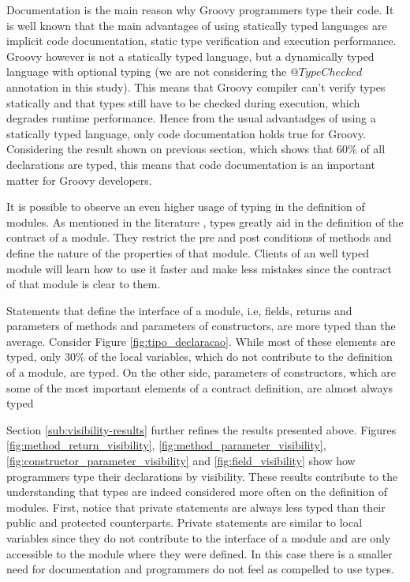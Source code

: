 \documentclass[preprint]{sigplanconf}
\begin{document}
Documentation is the main reason why Groovy programmers type their code.
It is well known that the main advantages of using statically typed languages are implicit code documentation, static type verification and execution performance.
Groovy however is not a statically typed language, but a dynamically typed language with optional typing (we are not considering the $@TypeChecked$ annotation in this study).
This means that Groovy compiler can't verify types statically and that types still have to be checked during execution, which degrades runtime performance.
Hence from the usual advantadges of using a statically typed language, only code documentation holds true for Groovy.
Considering the result shown on previous section, which shows that 60\% of all declarations are typed, this means that code documentation is an important matter for Groovy developers.

It is possible to observe an even higher usage of typing in the definition of modules.
As mentioned in the literature \cite{Meyer88, Meijer04, Wadler04, Plosch97, Flanagan2006, Furr09}, types greatly aid in the definition of the contract of a module.
They restrict the pre and post conditions of methods and define the nature of the properties of that module.
Clients of an well typed module will learn how to use it faster and make less mistakes since the contract of that module is clear to them.

Statements that define the interface of a module, i.e, fields, returns and parameters of methods and parameters of constructors, are more typed than the average.
Consider Figure \ref{fig:tipo_declaracao}.
While most of these elements are typed, only 30\%  of the local variables, which do not contribute to the definition of a module, are typed. On the other side, parameters of constructors, which are some of the most important elements of a contract definition, are almost always typed

Section \ref{sub:visibility-results} further refines the results presented above.
Figures \ref{fig:method_return_visibility}, \ref{fig:method_parameter_visibility}, \ref{fig:constructor_parameter_visibility} and \ref{fig:field_visibility} show how programmers type their declarations by visibility.
These results contribute to the understanding that types are indeed considered more often on the definition of modules.
First, notice that private statements are always less typed than their public and protected counterparts.
Private statements are similar to local variables since they do not contribute to the interface of a module and are only accessible to the module where they were defined.
In this case there is a smaller need for documentation and programmers do not feel as compelled to use types.
\end{document}
